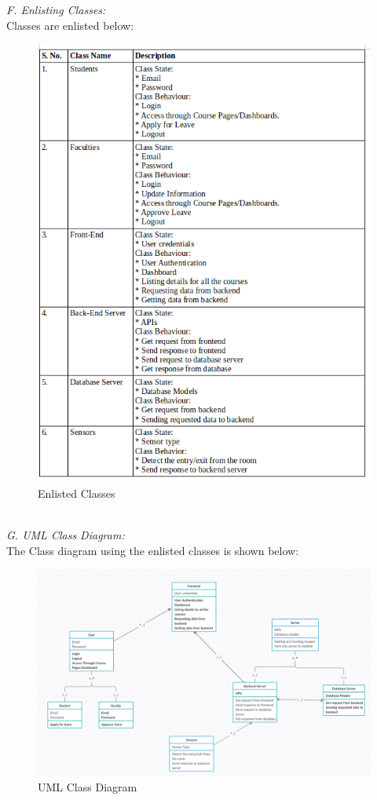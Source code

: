 \documentclass[conference]{IEEEtran}
\begin{document}
\emph {F. Enlisting Classes:}\\
Classes are enlisted below:
\begin{figure}[htbp]
\centerline{\includegraphics[scale=0.25]{Class.png}}
\caption{Enlisted Classes}
\label{fig}
\end{figure}\\

\emph {G. UML Class Diagram:}\\
The Class diagram using the enlisted classes is shown below:
\begin{figure}[htbp]
\centerline{\includegraphics[scale=0.2]{ClassDiagram.png}}
\caption{UML Class Diagram}
\label{fig}
\end{figure}
\\ 
\end{document}
